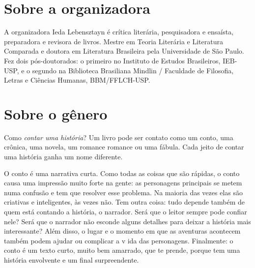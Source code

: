 \section{Sobre a organizadora}

A organizadora Ieda Lebensztayn é crítica literária, pesquisadora e ensaísta, preparadora e revisora de livros. Mestre em Teoria Literária e Literatura Comparada e doutora em Literatura Brasileira pela Universidade de São Paulo. Fez dois pós-doutorados: o primeiro no Instituto de Estudos Brasileiros, IEB-USP, e o segundo na Biblioteca Brasiliana Mindlin / Faculdade de Filosofia, Letras e Ciências Humanas, BBM/FFLCH-USP. 


\section{Sobre o gênero}

Como \textit{contar uma história}? Um livro pode ser contato como um conto, uma crônica,
uma novela, um romance romance ou uma fábula. Cada jeito de contar 
uma história ganha um nome diferente. 

O conto é uma narrativa curta. Como todas as coisas que são rápidas, o conto causa 
uma impressão muito forte na gente: as personagens principais se metem numa confusão 
e tem que resolver esse problema. Na maioria das vezes elas são criativas e inteligentes, 
às vezes não. Tem outra coisa: tudo depende também de quem está contando a história, 
o narrador. Será que o leitor sempre pode confiar nele? Será que o narrador não esconde 
alguns detalhes para deixar a história mais interessante? Além disso, o lugar e o 
momento em que as aventuras acontecem também podem ajudar ou complicar a v
ida das personagens. Finalmente: o conto é um texto curto, muito bem amarrado, 
que te prende, porque tem uma história envolvente e um final surpreendente.